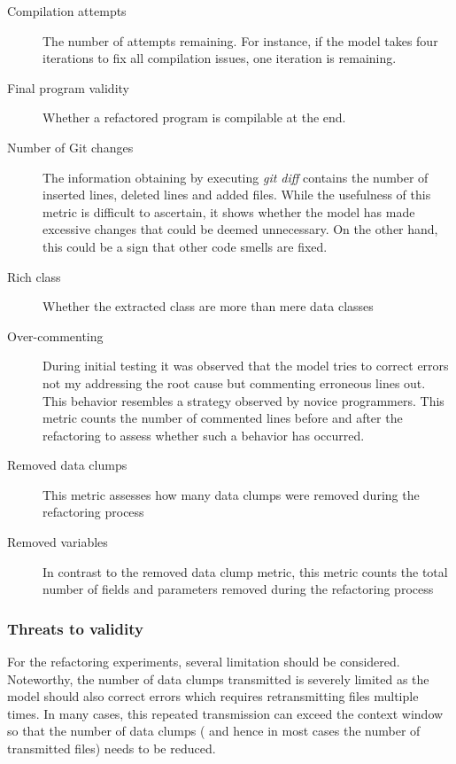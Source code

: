 \begin{description}
    \item [Compilation attempts] The number of attempts remaining. For instance, if the model takes four iterations to fix all compilation issues, one iteration is remaining. 
    \item[ Final program validity] Whether a refactored program is compilable at the end. 
    \item [Number of Git changes] The information obtaining by executing \textit{git diff} contains the number of inserted lines, deleted lines and added files. While the usefulness of this metric is difficult to ascertain, it shows whether the model has made excessive changes that could be deemed unnecessary. On the other hand, this could be a sign that other code smells are fixed. 
    \item [Rich class] Whether the extracted class are more than mere data classes
    \item [Over-commenting] During initial testing it was observed that the model tries to correct errors not my addressing the root cause but commenting erroneous lines out.  This behavior resembles a strategy observed by novice programmers. \cite{10.1145/1151588.1151600} This metric counts the number of commented lines before and after the refactoring to assess whether such a behavior has occurred. 
    \item [Removed data clumps] This metric assesses how many data clumps were removed during the refactoring process

    \item [Removed variables] In contrast to the removed data clump metric, this metric counts the total number of fields and parameters removed during the refactoring process
\end{description}

\subsubsection{Threats to validity}

For the refactoring experiments, several limitation should be considered. Noteworthy, the number of data clumps transmitted is severely limited as the model should also correct errors which requires retransmitting files multiple times. In many cases, this repeated transmission can exceed the context window so that the number of data clumps ( and hence in most cases the number of transmitted files)  needs to be reduced. 

